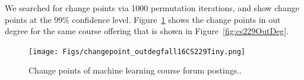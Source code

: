 We searched for change points via 1000 permutation iterations, and
show change points at the 99\% confidence
level. Figure~\ref{fig:cs229ChangePts} shows the change points in out
degree for the same course offering that is shown in
Figure~\ref{fig:cs229OutDeg}.
\begin{figure}[htp]
       \centering
       \texttt{[image: Figs/changepoint\_outdegfall16CS229Tiny.png]}
       \caption{\textnormal{Change points of machine learning course
           forum postings..}}
       \label{fig:cs229ChangePts}
\end{figure}








